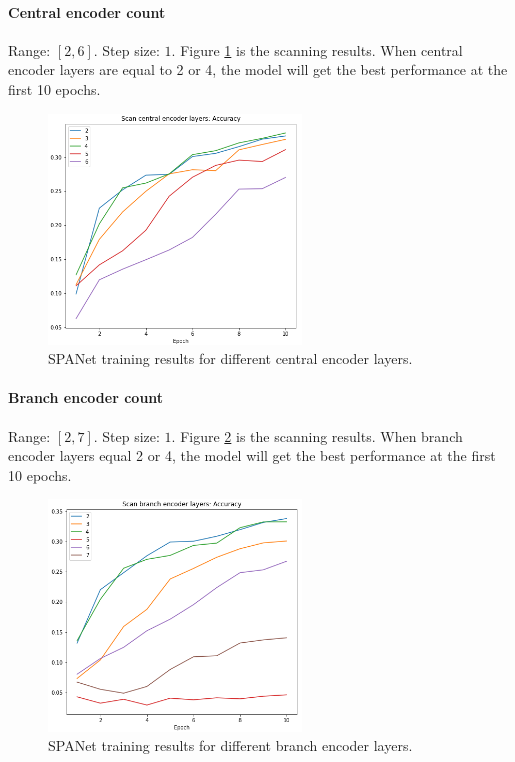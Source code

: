 \documentclass[12pt]{article}
\begin{document}
		\paragraph{Central encoder count} Range: $[2,6]$. Step size: $1$. Figure \ref{fig:SPANet_scan_n_cen} is the scanning results. When central encoder layers are equal to 2 or 4, the model will get the best performance at the first 10 epochs.
		\begin{figure}[htpb]
			\centering
			\includegraphics[width=0.6\textwidth]{accuracy_curve_hp_scan_n_cen.png}
			\caption{SPANet training results for different central encoder layers.}
			\label{fig:SPANet_scan_n_cen}
		\end{figure}

		\paragraph{Branch encoder count} Range: $[2,7]$. Step size: $1$. Figure \ref{fig:SPANet_scan_n_bren} is the scanning results. When branch encoder layers equal 2 or 4, the model will get the best performance at the first 10 epochs.
		\begin{figure}[htpb]
			\centering
			\includegraphics[width=0.6\textwidth]{accuracy_curve_hp_scan_n_bren.png}
			\caption{SPANet training results for different branch encoder layers.}
			\label{fig:SPANet_scan_n_bren}
		\end{figure}
\end{document}
